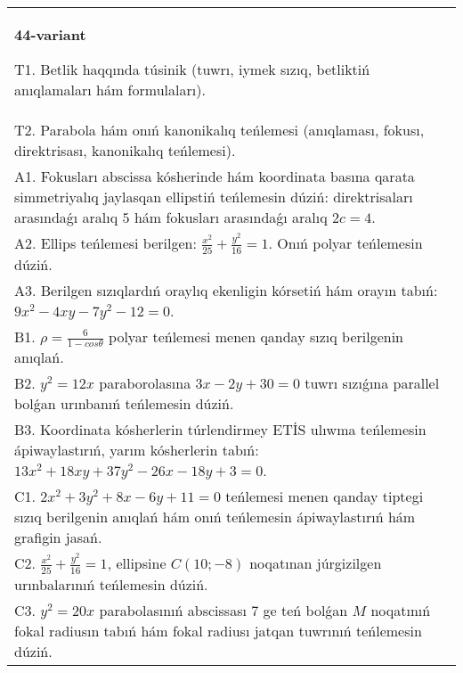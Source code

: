 \documentclass{article}
\begin{document}
\begin{tabular}{m{17cm}}
\textbf{44-variant}
\newline

T1. Betlik haqqında túsinik (tuwrı, iymek sızıq, betliktiń anıqlamaları hám formulaları).\\

T2. Parabola hám onıń kanonikalıq teńlemesi (anıqlaması, fokusı, direktrisası, kanonikalıq teńlemesi).\\

A1. Fokusları abscissa kósherinde hám koordinata basına qarata simmetriyalıq jaylasqan ellipstiń teńlemesin dúziń: direktrisaları arasındaǵı aralıq $5$ hám fokusları arasındaǵı aralıq $2 c=4$.\\

A2. Ellips teńlemesi berilgen: $\frac{x^2}{25}+\frac{y^2}{16}=1$. Onıń polyar teńlemesin dúziń.\\

A3. Berilgen sızıqlardıń oraylıq ekenligin kórsetiń hám orayın tabıń: $9 x^{2}-4 xy-7 y^{2}-12=0$.\\

B1. $\rho = \frac{6}{1 - cos\theta}$ polyar teńlemesi menen qanday sızıq berilgenin anıqlań.  \\

B2. $y^{2} = 12x$ paraborolasına $3x - 2y + 30 = 0$ tuwrı sızıǵına parallel bolǵan urınbanıń teńlemesin dúziń.  \\

B3. Koordinata kósherlerin túrlendirmey ETİS ulıwma teńlemesin ápiwaylastırıń, yarım kósherlerin tabıń: $13x^{2} + 18xy + 37y^{2} - 26x - 18y + 3 = 0$.  \\

C1. $2x^{2} + 3y^{2} + 8x - 6y + 11 = 0$ teńlemesi menen qanday tiptegi sızıq berilgenin anıqlań hám onıń teńlemesin ápiwaylastırıń hám grafigin jasań.  \\

C2. $\frac{x^{2}}{25} + \frac{y^{2}}{16} = 1$, ellipsine $C(10; - 8)$ noqatınan júrgizilgen urınbalarınıń teńlemesin dúziń.  \\

C3. $y^{2} = 20x$ parabolasınıń abscissası 7 ge teń bolǵan $M$ noqatınıń fokal radiusın tabıń hám fokal radiusı jatqan tuwrınıń teńlemesin dúziń.  \\

\end{tabular}
\vspace{1cm}
\end{document}

